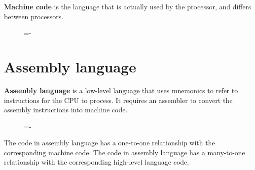 \documentclass[a4paper]{systems-software}
\begin{document}
\textbf{Machine code} is the language that is actually used by the processor, and differs between processors.

\begin{figure}[H]
  \lineskip=-\fboxrule
\end{figure}


\newpage

\section*{Assembly language}

\textbf{Assembly language} is a low-level language that uses mnemonics to refer to instructions for the CPU to process. It requires an assembler to convert the assembly instructions into machine code.

\begin{figure}[H]
  \lineskip=-\fboxrule
\end{figure}

The code in assembly language has a one-to-one relationship with the corresponding machine code.
The code in assembly language has a many-to-one relationship with the corresponding high-level language code.
\end{document}
